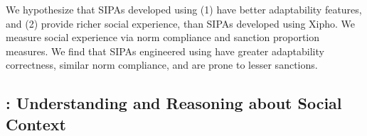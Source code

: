 We hypothesize that SIPAs developed using \frameworkA (1) have better
adaptability features, and (2) provide richer social experience, than
SIPAs developed using Xipho. We measure social experience via norm
compliance and sanction proportion measures. We find that SIPAs
engineered using \frameworkA have greater adaptability correctness,
similar norm compliance, and are prone to lesser sanctions.

\subsection[Understanding Social Context]{\frameworkB: Understanding and Reasoning about Social Context}



